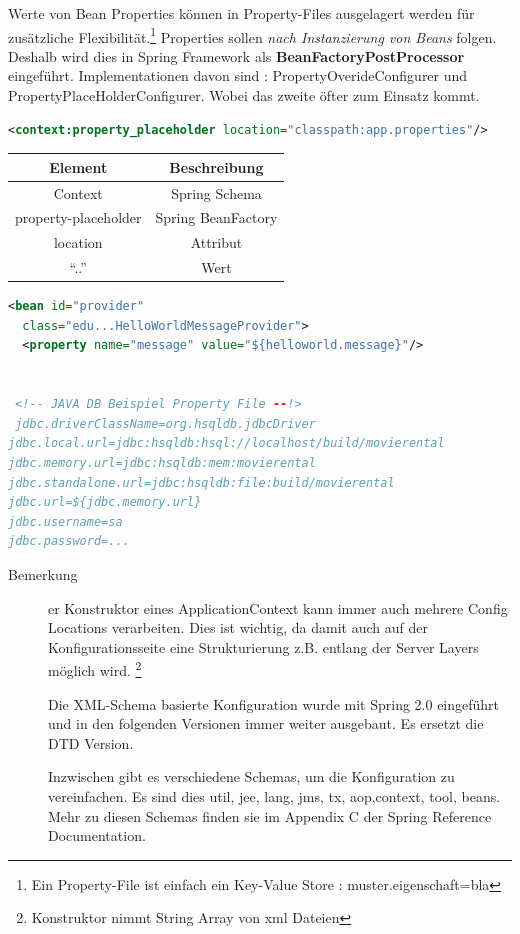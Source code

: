 \documentclass[a4paper,10pt]{scrreprt}
\begin{document}
Werte von Bean Properties können in Property-Files ausgelagert werden für zusätzliche Flexibilität.\footnote{Ein Property-File ist einfach ein Key-Value Store : muster.eigenschaft=bla}
Properties sollen \textit{nach Instanzierung von Beans} folgen. Deshalb wird dies in Spring Framework als \textbf{BeanFactoryPostProcessor} eingeführt.
Implementationen davon sind : PropertyOverideConfigurer und PropertyPlaceHolderConfigurer. Wobei das zweite öfter zum Einsatz kommt.

\begin{lstlisting}[language=xml,caption=property-placeholder Eintrag]
 <context:property_placeholder location="classpath:app.properties"/>
\end{lstlisting}

\begin{tabular}{c c}
 Element & Beschreibung  \\ \hline
 Context & Spring Schema \\
 property-placeholder & Spring BeanFactory\\
 location & Attribut \\
 ``..'' & Wert \\
 
\end{tabular}

\begin{lstlisting}[language=xml,caption=Einsatzbeispiele von property-placeholder]
 <bean id="provider"
  class="edu...HelloWorldMessageProvider">
  <property name="message" value="${helloworld.message}"/>
  
  
 <!-- JAVA DB Beispiel Property File --!>
 jdbc.driverClassName=org.hsqldb.jdbcDriver
jdbc.local.url=jdbc:hsqldb:hsql://localhost/build/movierental
jdbc.memory.url=jdbc:hsqldb:mem:movierental
jdbc.standalone.url=jdbc:hsqldb:file:build/movierental
jdbc.url=${jdbc.memory.url}
jdbc.username=sa
jdbc.password=...

\end{lstlisting}

\begin{description}
 \item [Bemerkung] er Konstruktor eines ApplicationContext kann immer auch mehrere Config Locations
verarbeiten. Dies ist wichtig, da damit auch auf der Konfigurationsseite eine Strukturierung z.B.
entlang der Server Layers möglich wird. \footnote{Konstruktor nimmt String Array von xml Dateien}

Die XML-Schema basierte Konfiguration wurde mit Spring 2.0 eingeführt und in den folgenden
Versionen immer weiter ausgebaut. Es ersetzt die DTD Version.

Inzwischen gibt es verschiedene Schemas, um die Konfiguration zu vereinfachen. Es sind dies
util, jee, lang, jms, tx, aop,context, tool, beans. Mehr zu diesen Schemas finden sie im
Appendix C der Spring Reference Documentation.


\end{description}
\end{document}
